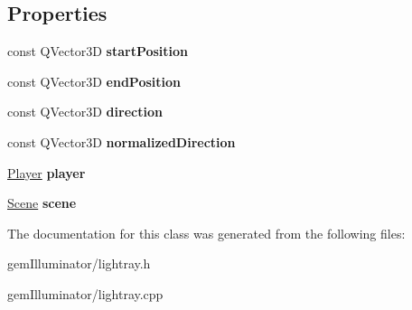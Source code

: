 \subsection*{Properties}
\begin{DoxyCompactItemize}
\item 
\hypertarget{class_light_ray_af91b7c6c3c299e2a39b8c7f016f9ce15}{}const Q\+Vector3\+D {\bfseries start\+Position}\label{class_light_ray_af91b7c6c3c299e2a39b8c7f016f9ce15}

\item 
\hypertarget{class_light_ray_a79917df93dd2cc9c8915fe659b3dd0da}{}const Q\+Vector3\+D {\bfseries end\+Position}\label{class_light_ray_a79917df93dd2cc9c8915fe659b3dd0da}

\item 
\hypertarget{class_light_ray_ab7d1b417505cb68548114b03c8ecde8e}{}const Q\+Vector3\+D {\bfseries direction}\label{class_light_ray_ab7d1b417505cb68548114b03c8ecde8e}

\item 
\hypertarget{class_light_ray_aab55396a68a866e18897a8b622773b27}{}const Q\+Vector3\+D {\bfseries normalized\+Direction}\label{class_light_ray_aab55396a68a866e18897a8b622773b27}

\item 
\hypertarget{class_light_ray_ac86091ec591fbf919bcc6c97beee47ec}{}\hyperlink{class_player}{Player} {\bfseries player}\label{class_light_ray_ac86091ec591fbf919bcc6c97beee47ec}

\item 
\hypertarget{class_light_ray_afd3d673f6ca3570f648bb706d7f2d6e6}{}\hyperlink{class_scene}{Scene} {\bfseries scene}\label{class_light_ray_afd3d673f6ca3570f648bb706d7f2d6e6}

\end{DoxyCompactItemize}


The documentation for this class was generated from the following files\+:\begin{DoxyCompactItemize}
\item 
gem\+Illuminator/lightray.\+h\item 
gem\+Illuminator/lightray.\+cpp\end{DoxyCompactItemize}
